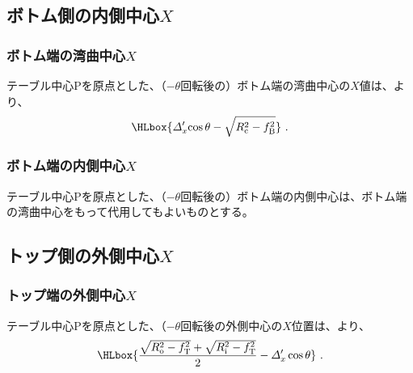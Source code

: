 \subsection{ボトム側の内側中心\texorpdfstring{$X$}{X}}

\subsubsection{ボトム端の湾曲中心\texorpdfstring{$X$}{X}}
テーブル中心Pを原点とした、（$-\theta$回転後の）ボトム端の湾曲中心の$X$値は、より、
\begin{align*}
  \HLbox{\varDelta_x'\!\cos\theta-\sqrt{R_\mathrm c^2-f_\mathrm B^2}}~.
\end{align*}

\subsubsection{ボトム端の内側中心\texorpdfstring{$X$}{X}}
テーブル中心Pを原点とした、（$-\theta$回転後の）ボトム端の内側中心は、ボトム端の湾曲中心をもって代用してもよいものとする。


\clearpage
\subsection{トップ側の外側中心\texorpdfstring{$X$}{X}}

\subsubsection{トップ端の外側中心\texorpdfstring{$X$}{X}}
テーブル中心Pを原点とした、（$-\theta$回転後の外側中心の$X$位置は、より、
\begin{align*}
  \HLbox{%
    \frac{\sqrt{R_\mathrm o^2-f_\mathrm T^2}+\sqrt{R_\mathrm i^2-f_\mathrm T^2}}2-\varDelta_x'\cos\theta%
  }~.
\end{align*}

